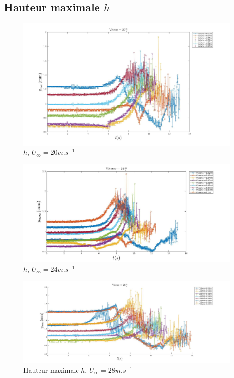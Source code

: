 \documentclass[french]{article}
\begin{document}
\subsection{Hauteur maximale $h$}
\begin{figure}[h]
	\centering
	\includegraphics[width = \linewidth]{./image/v=20ym.jpg}
	\caption{$h$, $U_{\infty}=20m.s^{-1}$}
\end{figure}
\begin{figure}[h]
	\centering
	\includegraphics[width = \linewidth]{./image/v=24ym.jpg}
	\caption{$h$, $U_{\infty}=24m.s^{-1}$}
\end{figure}
\begin{figure}[h]
	\centering
	\includegraphics[width = \linewidth]{./image/v=28ym.jpg}
	\caption{Hauteur maximale $h$, $U_{\infty}=28m.s^{-1}$}
\end{figure}
\end{document}

